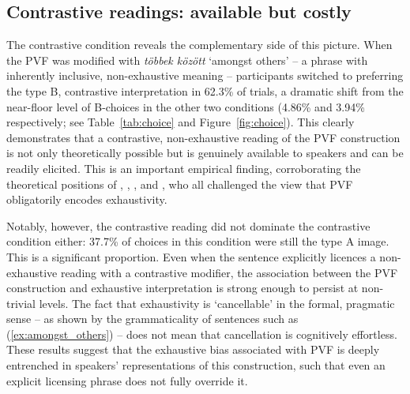 \documentclass[a4paper, ruler]{CUP-JNL-LIN}%
\begin{document}
\subsection{Contrastive readings: available but costly}

The contrastive condition reveals the complementary side of this picture. When the PVF was modified with \textit{többek között} `amongst others' -- a phrase with inherently inclusive, non-exhaustive meaning -- participants switched to preferring the type B, contrastive interpretation in 62.3\% of trials, a dramatic shift from the near-floor level of B-choices in the other two conditions (4.86\% and 3.94\% respectively; see Table~\ref{tab:choice} and Figure~\ref{fig:choice}). This clearly demonstrates that a contrastive, non-exhaustive reading of the PVF construction is not only theoretically possible but is genuinely available to speakers and can be readily elicited. This is an important empirical finding, corroborating the theoretical positions of \citet{wedgwood_2006_hungarian}, \citet{onea_2009_hungarian}, \citet{balogh_2013_hungarian}, and \citet{kaldi_2016_magyar}, who all challenged the view that PVF obligatorily encodes exhaustivity.

Notably, however, the contrastive reading did not dominate the contrastive condition either: 37.7\% of choices in this condition were still the type A image. This is a significant proportion. Even when the sentence explicitly licences a non-exhaustive reading with a contrastive modifier, the association between the PVF construction and exhaustive interpretation is strong enough to persist at non-trivial levels. The fact that exhaustivity is `cancellable' in the formal, pragmatic sense -- as shown by the grammaticality of sentences such as (\ref{ex:amongst_others}) -- does not mean that cancellation is cognitively effortless. These results suggest that the exhaustive bias associated with PVF is deeply entrenched in speakers' representations of this construction, such that even an explicit licensing phrase does not fully override it.
\end{document}
